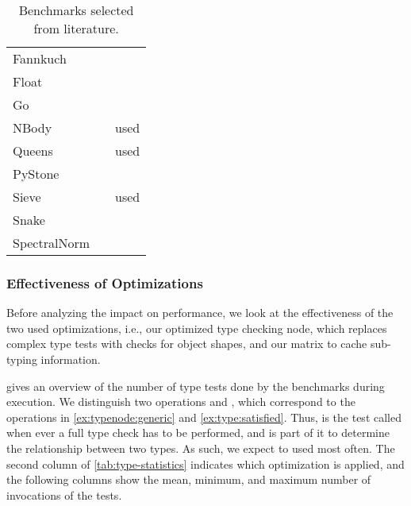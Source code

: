 \begin{table}
\caption{Benchmarks selected from literature.}
\label{tab:gradual-benchmarks}
\begin{center}
  \begin{tabular}{l l r}
    Fannkuch & \cite{Vitousek2017,Greenman2018} \\
    Float & \cite{Vitousek2017,Muehlboeck2017,Greenman2018} \\
    Go & \cite{Vitousek2017,Muehlboeck2017,Greenman2018} \\
    NBody & \cite{Kuhlenschmidt:2018:preprint,Vitousek2017,Greenman2018} & used \cite{Marr2016} \\
    Queens & \cite{Vitousek2017,Muehlboeck2017,Greenman2018} & used \cite{Marr2016} \\
    PyStone & \cite{Vitousek2017,Muehlboeck2017,Greenman2018} \\
    Sieve & \cite{Takikawa2016,Muehlboeck2017,Bauman2017,Richards2017} & used \cite{Marr2016} \\
    Snake & \cite{Takikawa2016,Muehlboeck2017,Bauman2017,Richards2017} \\
    SpectralNorm & \cite{Vitousek2017,Muehlboeck2017,Greenman2018} \\
  \end{tabular}  
\end{center}
\end{table}

\subsubsection{Effectiveness of Optimizations}

Before analyzing the impact on performance,
we look at the effectiveness of the two used optimizations, i.e.,
our optimized type checking node, which replaces complex type tests
with checks for object shapes, and our matrix to cache sub-typing information.

 gives an overview of the number of type tests done
by the benchmarks during execution.
We distinguish two operations  and ,
which correspond to the operations in \cref{ex:typenode:generic} and \cref{ex:type:satisfied}.
Thus,  is the test called when ever a full type check has to
be performed, and  is part of it to determine the relationship
between two types.
As such, we expect  to used most often.
The second column of \cref{tab:type-statistics} indicates
which optimization is applied,
and the following columns show the mean,
minimum, and maximum number of invocations of the tests.

